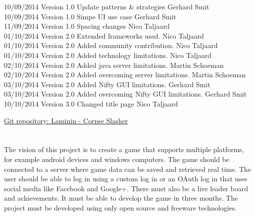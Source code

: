 \documentclass[letterpaper]{article}
\begin{document}
\begin{tabbing}
			10/09/2014	\> Version 1.0	\> Update patterns \& strategies				\> Gerhard Smit \\
			10/09/2014	\> Version 1.0	\> Simpe UI use case							\> Gerhard Smit \\
			11/09/2014	\> Version 1.0	\> Spacing changes								\> Nico Taljaard \\
			01/10/2014	\> Version 2.0	\> Extended frameworks used.					\> Nico Taljaard \\
			01/10/2014	\> Version 2.0	\> Added community contribution.				\> Nico Taljaard \\
			01/10/2014	\> Version 2.0	\> Added technology limitations.				\> Nico Taljaard \\
			02/10/2014	\> Version 2.0	\> Added java server limitations.				\> Martin Schoeman\\
			02/10/2014	\> Version 2.0	\> Added overcoming server limitations.			\> Martin Schoeman\\
			03/10/2014	\> Version 2.0	\> Added Nifty GUI limitations.					\> Gerhard Smit\\
			03/10/2014	\> Version 2.0	\> Added overcoming Nifty GUI limitations.		\> Gerhard Smit\\
			10/10/2014	\> Version 3.0	\> Changed title page							\> Nico Taljaard\\
		\end{tabbing}
		
	\newpage
		\renewcommand\contentsname{TABLE OF CONTENTS}
		\newcommand\contentsnameLC{\colorbox{black}{\makebox[\textwidth-2\fboxsep][l]{\bfseries\color{red} Table of Contents}}}
		
		\renewcommand{\cftdot}{}
		\hypersetup{linktocpage}
		\tableofcontents
		
		\begin{flushleft}
			\LARGE\href{https://github.com/njTaljaard/Laminin_CorpseSlasher/}{Git repository: Laminin - Corpse Slasher}
		\end{flushleft}
		
	\newpage
	
		\section*{\colorbox{black}{}} 
		\vspace{0.2in}
		
		The vision of this project is to create a game that supports multiple platforms, for example android devices and windows computers. The game should be connected to a server where game data can be saved and retrieved real time. The user should be able to log in using a custom log in or an OAuth log in that uses social media like Facebook and Google+. There must also be a live leader board and achievements. It must be able to develop the game in three months. The project must be developed using only open source and freeware technologies.
					
\end{document}
